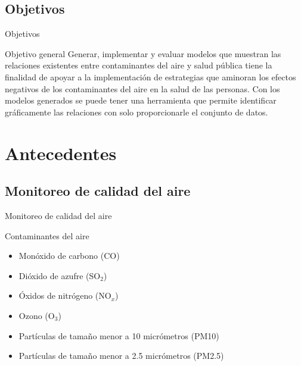\documentclass[11pt]{beamer}
\begin{document}
\subsection{Objetivos}
\begin{frame}{Objetivos} 
\begin{block}{Objetivo general} \justifying
Generar, implementar y evaluar modelos que muestran las relaciones existentes entre contaminantes del aire y salud pública tiene la finalidad de apoyar a la implementación de estrategias que aminoran los efectos negativos de los contaminantes del aire en la salud de las personas. Con los modelos generados se puede tener una herramienta que permite identificar gráficamente las relaciones con solo proporcionarle el conjunto de datos.
\end{block}
\end{frame}


\section{Antecedentes}

\subsection{Monitoreo de calidad del aire}
\begin{frame}{Monitoreo de calidad del aire}
\begin{block}{Contaminantes del aire} \justifying
\begin{itemize}
	\item Monóxido de carbono (CO)
	\item Dióxido de azufre (SO$_2$)
	\item Óxidos de nitrógeno (NO$_x$)
	\item Ozono (O$_3$)
	\item Partículas de tamaño menor a 10 micrómetros (PM10)
	\item Partículas de tamaño menor a 2.5 micrómetros (PM2.5)
\end{itemize}
\end{block}
\end{frame}
\end{document}
